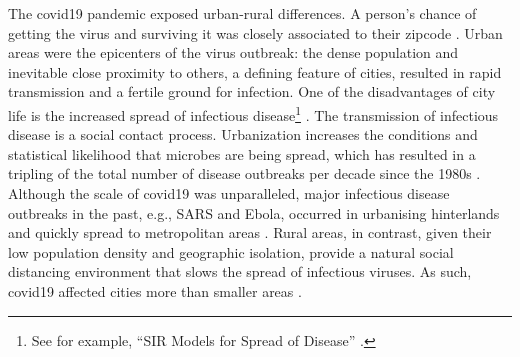 \documentclass[10pt, letterpaper]{article}
\begin{document}
\begin{spacing}{1.4}
The covid19 pandemic exposed urban-rural differences. %
 A person's chance of getting the virus and surviving it was closely associated to their zipcode \citep{chen2021}. Urban areas were the epicenters of the virus outbreak: the dense population and inevitable close proximity to others, a defining feature of cities, resulted in rapid transmission and a fertile ground for infection. %
 One of the disadvantages of city life is the increased spread of infectious
 disease\footnote{See for example, ``SIR Models for Spread of Disease'' \citep{newman2002spread,cooper2020sir}. } \citep{bettencourt10,bettencourt07}. %
The transmission of infectious disease is a social contact process. Urbanization  increases the conditions and statistical likelihood that microbes are being spread, which has resulted in a tripling of the total number of disease outbreaks per decade since the 1980s \citep{ali2011,haggett1994,connolly2021}. Although the scale of covid19 was unparalleled,  major infectious disease
outbreaks in the past, e.g., SARS and Ebola, occurred in urbanising hinterlands and quickly spread to metropolitan areas \citep{keil2007}. Rural areas, in contrast, given their low population density and geographic isolation, provide a natural social distancing environment that slows the spread of infectious viruses. As such, covid19 affected cities more than smaller areas \citep{stier2021early}.







\end{spacing}
\end{document}
